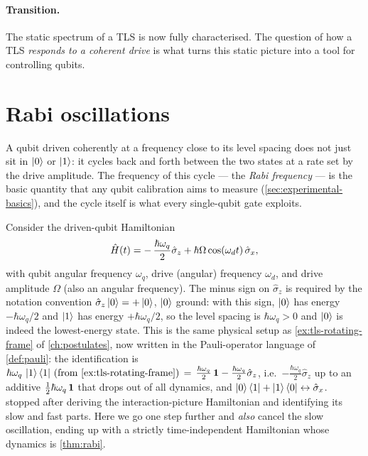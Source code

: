 \paragraph{Transition.}
The static spectrum of a TLS is now fully characterised. The
question of how a TLS \emph{responds to a coherent drive} is what
turns this static picture into a tool for controlling qubits.

\section{Rabi oscillations}
\label{sec:rabi}

\begin{phenomenon}
A qubit driven coherently at a frequency close to its level
spacing does not just sit in $\ket{0}$ or $\ket{1}$: it cycles
back and forth between the two states at a rate set by the drive
amplitude. The frequency of this cycle --- the \emph{Rabi
frequency} --- is the basic quantity that any qubit calibration
aims to measure (\cref{sec:experimental-basics}), and the cycle
itself is what every single-qubit gate exploits.
\end{phenomenon}

Consider the driven-qubit Hamiltonian
\begin{equation}
\label{eq:driven-tls}
\hat{H}(t) = -\,\frac{\hbar\omega_q}{2}\hat\sigma_z
          + \hbar\Omega\cos(\omega_d t)\,\hat\sigma_x,
\end{equation}
with qubit angular frequency $\omega_q$, drive (angular) frequency
$\omega_d$, and drive amplitude $\Omega$ (also an angular
frequency). The minus sign on $\hat\sigma_z$ is required by the
notation convention $\hat\sigma_z\ket{0}=+\ket{0}$, $\ket{0}$
ground: with this sign, $\ket{0}$ has energy
$-\hbar\omega_q/2$ and $\ket{1}$ has energy $+\hbar\omega_q/2$,
so the level spacing is $\hbar\omega_q>0$ and $\ket{0}$ is indeed
the lowest-energy state. This is the same physical setup as
\cref{ex:tls-rotating-frame} of \cref{ch:postulates}, now written
in the Pauli-operator language of \cref{def:pauli}: the
identification is
$\hbar\omega_q\,\ket{1}\bra{1}\,(\text{from }\cref{ex:tls-rotating-frame})
\,=\,\frac{\hbar\omega_q}{2}\,\id-\frac{\hbar\omega_q}{2}\hat\sigma_z$,
i.e.\ $-\frac{\hbar\omega_q}{2}\hat\sigma_z$ up to an additive
$\frac12 \hbar\omega_q\,\mathbf{1}$ that drops out of all dynamics, and
$\ket{0}\bra{1}+\ket{1}\bra{0}\leftrightarrow\hat\sigma_x$.
 stopped after deriving the
interaction-picture Hamiltonian and identifying its slow and fast
parts. Here we go one step further and \emph{also} cancel the
slow oscillation, ending up with a strictly time-independent
Hamiltonian whose dynamics is \cref{thm:rabi}.

